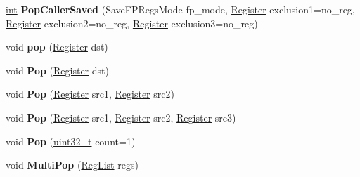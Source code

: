 \begin{DoxyCompactItemize}
\item 
\mbox{\label{classv8_1_1internal_1_1TurboAssembler_a5f104f3d3c969b063fb4d1dfdc643b1c}} 
\mbox{\hyperlink{classint}{int}} {\bfseries Pop\+Caller\+Saved} (Save\+F\+P\+Regs\+Mode fp\+\_\+mode, \mbox{\hyperlink{classv8_1_1internal_1_1Register}{Register}} exclusion1=no\+\_\+reg, \mbox{\hyperlink{classv8_1_1internal_1_1Register}{Register}} exclusion2=no\+\_\+reg, \mbox{\hyperlink{classv8_1_1internal_1_1Register}{Register}} exclusion3=no\+\_\+reg)
\item 
\mbox{\label{classv8_1_1internal_1_1TurboAssembler_a7bcb3f467d89d755bc990f0b2d447276}} 
void {\bfseries pop} (\mbox{\hyperlink{classv8_1_1internal_1_1Register}{Register}} dst)
\item 
\mbox{\label{classv8_1_1internal_1_1TurboAssembler_ae9f509e9775eb9218c242f6e34cb3fd7}} 
void {\bfseries Pop} (\mbox{\hyperlink{classv8_1_1internal_1_1Register}{Register}} dst)
\item 
\mbox{\label{classv8_1_1internal_1_1TurboAssembler_a09d8bf362397e9e5a5410332eed50a75}} 
void {\bfseries Pop} (\mbox{\hyperlink{classv8_1_1internal_1_1Register}{Register}} src1, \mbox{\hyperlink{classv8_1_1internal_1_1Register}{Register}} src2)
\item 
\mbox{\label{classv8_1_1internal_1_1TurboAssembler_a4f292a2a7107becc39189be16db99276}} 
void {\bfseries Pop} (\mbox{\hyperlink{classv8_1_1internal_1_1Register}{Register}} src1, \mbox{\hyperlink{classv8_1_1internal_1_1Register}{Register}} src2, \mbox{\hyperlink{classv8_1_1internal_1_1Register}{Register}} src3)
\item 
\mbox{\label{classv8_1_1internal_1_1TurboAssembler_a6e739a162743a569716824c62a0342fd}} 
void {\bfseries Pop} (\mbox{\hyperlink{classuint32__t}{uint32\+\_\+t}} count=1)
\item 
\mbox{\label{classv8_1_1internal_1_1TurboAssembler_a929cabcdd0d88354308d733413446489}} 
void {\bfseries Multi\+Pop} (\mbox{\hyperlink{classuint32__t}{Reg\+List}} regs)

\end{DoxyCompactItemize}
